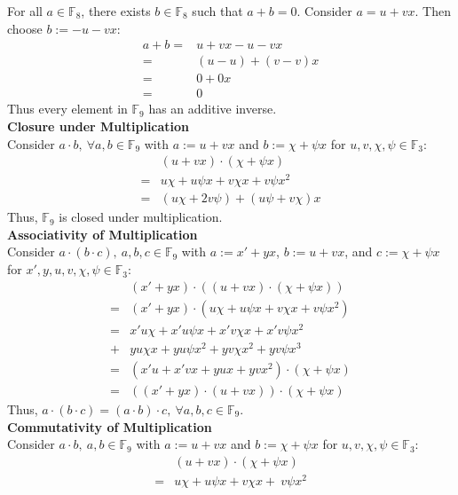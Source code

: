 \documentclass[11pt]{article}
\begin{document}
\begin{flushleft}
For all $a \in \mathbb{F}_8$, there exists $b \in \mathbb{F}_8$ such that $a + b = 0$. Consider $a = u + vx$. Then choose $b := -u -vx$:
\begin{align*}
a + b = & u + vx - u - vx \\
= & (u - u) + (v - v)x \\
= & 0 + 0x \\
= & 0
\end{align*}
Thus every element in $\mathbb{F}_9$ has an additive inverse.\\
\bigskip
\textbf{Closure under Multiplication} \\
Consider $a \cdot b, \ \forall a,b \in \mathbb{F}_9$ with $a := u + vx$ and $b :=\chi + \psi x$ for $u,v, \chi, \psi \in \mathbb{F}_3$:
\begin{align*}
& (u + vx) \cdot (\chi + \psi x) \\
= &  u \chi + u \psi x + v \chi x + v \psi x^2 \\
= & (u \chi + 2 v \psi) + (u \psi + v \chi)x
\end{align*}
Thus, $\mathbb{F}_9$ is closed under multiplication. \\
\bigskip
\textbf{Associativity of Multiplication} \\
Consider $a \cdot (b \cdot c), \ a,b,c \in \mathbb{F}_9$ with $a := x' + yx$, $b := u + vx$, and $c :=\chi + \psi x$ for $x',y,u,v, \chi, \psi \in \mathbb{F}_3$:
\begin{align*}
& (x' + yx) \cdot ((u + vx) \cdot (\chi + \psi x) ) \\
= & (x' + yx) \cdot (u \chi + u \psi x + v \chi x + v \psi x^2) \\
= & x'u \chi + x'u \psi x + x'v \chi x + x'v \psi x^2 \\
+ & yu \chi x + yu \psi x^2 + yv \chi x^2 + yv \psi x^3 \\
= & (x' u + x' vx + yux + yvx^2 ) \cdot (\chi + \psi x) \\
= & ((x' + yx) \cdot (u + vx)) \cdot (\chi + \psi x)
\end{align*}
Thus, $a \cdot (b \cdot c) = (a \cdot b) \cdot c, \ \forall a,b,c \in \mathbb{F}_9$. \\
\bigskip
\textbf{Commutativity of Multiplication} \\
Consider $a \cdot b, \ a,b \in \mathbb{F}_9$ with $a := u + vx$ and $b := \chi + \psi x$ for $u,v,\chi,\psi \in \mathbb{F}_3$:
\begin{align*}
& (u + vx) \cdot (\chi + \psi x) \\
= & u \chi + u \psi x + v \chi x + \ v \psi x^2 \\

\end{align*}
\end{flushleft}
\end{document}
